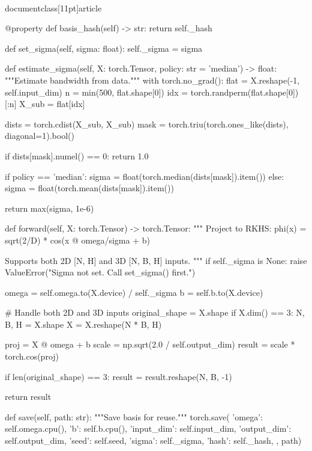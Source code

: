 \\documentclass[11pt]{article}
\begin{document}
\begin{CodeBlock}
    @property
    def basis_hash(self) -> str:
        return self._hash
    
    def set_sigma(self, sigma: float):
        self._sigma = sigma
    
    def estimate_sigma(self, X: torch.Tensor, policy: str = 'median') -> float:
        """Estimate bandwidth from data."""
        with torch.no_grad():
            flat = X.reshape(-1, self.input_dim)
            n = min(500, flat.shape[0])
            idx = torch.randperm(flat.shape[0])[:n]
            X_sub = flat[idx]
            
            dists = torch.cdist(X_sub, X_sub)
            mask = torch.triu(torch.ones_like(dists), diagonal=1).bool()
            
            if dists[mask].numel() == 0:
                return 1.0
            
            if policy == 'median':
                sigma = float(torch.median(dists[mask]).item())
            else:
                sigma = float(torch.mean(dists[mask]).item())
            
            return max(sigma, 1e-6)
    
    def forward(self, X: torch.Tensor) -> torch.Tensor:
        """
        Project to RKHS: phi(x) = sqrt(2/D) * cos(x @ omega/sigma + b)
        
        Supports both 2D [N, H] and 3D [N, B, H] inputs.
        """
        if self._sigma is None:
            raise ValueError("Sigma not set. Call set_sigma() first.")
        
        omega = self.omega.to(X.device) / self._sigma
        b = self.b.to(X.device)
        
        # Handle both 2D and 3D inputs
        original_shape = X.shape
        if X.dim() == 3:
            N, B, H = X.shape
            X = X.reshape(N * B, H)
        
        proj = X @ omega + b
        scale = np.sqrt(2.0 / self.output_dim)
        result = scale * torch.cos(proj)
        
        if len(original_shape) == 3:
            result = result.reshape(N, B, -1)
        
        return result
    
    def save(self, path: str):
        """Save basis for reuse."""
        torch.save({
            'omega': self.omega.cpu(),
            'b': self.b.cpu(),
            'input_dim': self.input_dim,
            'output_dim': self.output_dim,
            'seed': self.seed,
            'sigma': self._sigma,
            'hash': self._hash,
        }, path)
    

\end{CodeBlock}
\end{document}

